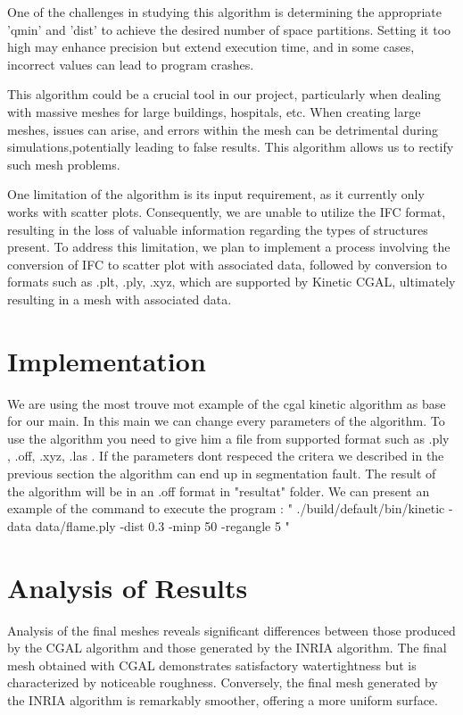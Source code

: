 \documentclass{article}
\begin{document}
  One of the challenges in studying this algorithm is determining the appropriate 'qmin' and 'dist' to achieve the desired number of space partitions.
  Setting it too high may enhance precision but extend execution time, and in some cases, incorrect values can lead to program crashes.

This algorithm could be a crucial tool in our project, particularly when dealing with massive meshes for large buildings,
hospitals, etc. When creating large meshes, issues can arise, and errors within the mesh can be detrimental during simulations,potentially leading to false results. 
This algorithm allows us to rectify such mesh problems.

One limitation of the algorithm is its input requirement, as it currently only works with scatter plots. Consequently, we are unable to utilize the IFC format, 
resulting in the loss of valuable information regarding the types of structures present. To address this limitation, 
we plan to implement a process involving the conversion of IFC to scatter plot with associated data, followed by conversion to formats such as .plt, .ply, .xyz,
which are supported by Kinetic CGAL, ultimately resulting in a mesh with associated data.


\section{Implementation}

We are using the most trouve mot example of the cgal kinetic algorithm as base for our main. In this main we can change every parameters of the algorithm.
\newline
To use the algorithm you need to give him a file from supported format such as .ply , .off, .xyz, .las .
If the parameters dont respeced the critera we described in the previous section the algorithm can end up in segmentation fault.
The result of the algorithm will be in an .off format in "resultat" folder.
\newline
We can present an example of the command to execute the program :
\newline
" ./build/default/bin/kinetic -data data/flame.ply -dist 0.3 -minp 50 -regangle 5  "
\newline
\section{Analysis of Results}

Analysis of the final meshes reveals significant differences between those produced by the CGAL algorithm and those generated by the INRIA algorithm. The final mesh obtained with CGAL demonstrates satisfactory watertightness but is characterized by noticeable roughness. Conversely, the final mesh generated by the INRIA algorithm is remarkably smoother, offering a more uniform surface.
\end{document}
